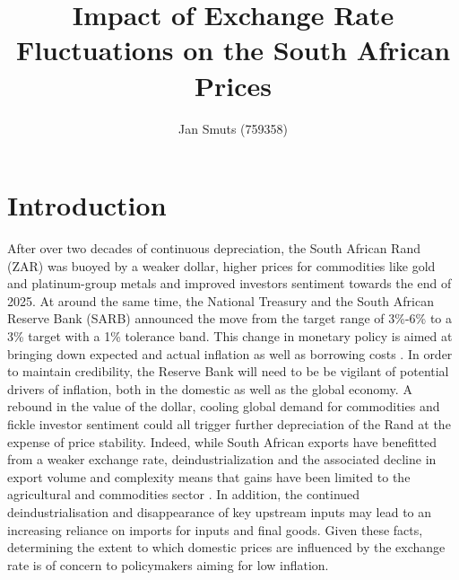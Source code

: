 \documentclass[12pt]{article}
\title{Impact of Exchange Rate Fluctuations on the South African Prices}
\author{Jan Smuts (759358)}
\begin{document}
\maketitle

\vspace{-2.2em}
\section*{Introduction}
After over two decades of continuous depreciation, the South African Rand (ZAR) was buoyed by a weaker dollar, higher prices for commodities like gold and platinum-group metals and improved investors sentiment towards the end of 2025. 
At around the same time, the National Treasury and the South African Reserve Bank (SARB) announced the move from the target range of 3\%-6\% to a 3\% target with a 1\% tolerance band. This change in monetary policy is aimed at bringing down expected and actual inflation as well as borrowing costs \parencite{sa_infl}.
In order to maintain credibility, the Reserve Bank will need to be be vigilant of potential drivers of inflation, both in the domestic as well as the global economy. A rebound in the value of the dollar, cooling global demand for commodities and fickle investor sentiment could all trigger further depreciation of the Rand at the expense of price stability. 
Indeed, while South African exports have benefitted from a weaker exchange rate, deindustrialization and the associated decline in export volume and complexity means that gains have been limited to the agricultural and commodities sector \parencite{stern_ramkolowan}.
In addition, the continued deindustrialisation and disappearance of key upstream inputs may lead to an increasing reliance on imports for inputs and final goods. Given these facts, determining the extent to which domestic prices are influenced by the exchange rate is of concern to policymakers aiming for low inflation. \\ 
\end{document}
